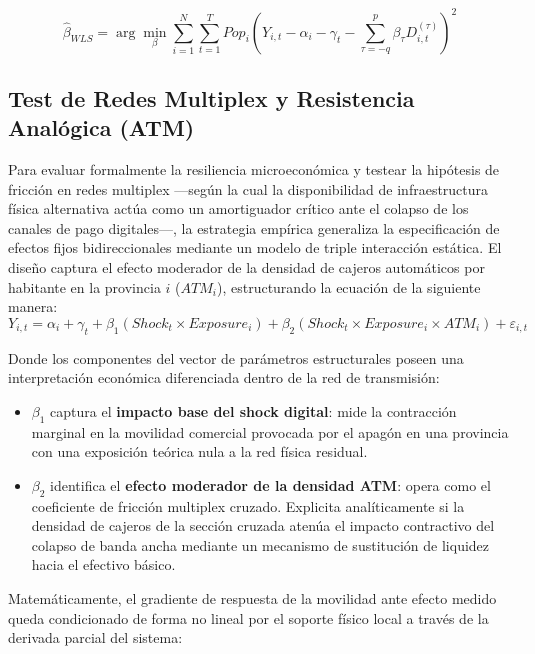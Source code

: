 \begin{equation}
    \hat{\beta}_{WLS} = \arg\min_{\beta} \sum_{i=1}^{N} \sum_{t=1}^{T} Pop_i \left( Y_{i,t} - \alpha_i - \gamma_t - \sum_{\tau = -q}^{p} \beta_{\tau} D_{i,t}^{(\tau)} \right)^2
\end{equation}

\subsection{Test de Redes Multiplex y Resistencia Anal\'ogica (ATM)}
\label{sec:4_2}

Para evaluar formalmente la resiliencia microecon\'omica y testear la hip\'otesis de fricci\'on en redes multiplex ---seg\'un la cual la disponibilidad de infraestructura f\'isica alternativa act\'ua como un amortiguador cr\'itico ante el colapso de los canales de pago digitales---, la estrategia emp\'irica generaliza la especificaci\'on de efectos fijos bidireccionales mediante un modelo de triple interacci\'on est\'atica. El dise\~no captura el efecto moderador de la densidad de cajeros autom\'aticos por habitante en la provincia $i$ ($ATM_i$), estructurando la ecuaci\'on de la siguiente manera:
\begin{equation}
    Y_{i,t} = \alpha_i + \gamma_t + \beta_1 \left( Shock_t \times Exposure_i \right) + \beta_2 \left( Shock_t \times Exposure_i \times ATM_i \right) + \varepsilon_{i,t}
    \label{eq:multiplex_atm}
\end{equation}

Donde los componentes del vector de par\'ametros estructurales poseen una interpretaci\'on econ\'omica diferenciada dentro de la red de transmisi\'on:

\begin{itemize}
    \item $\beta_1$ captura el \textbf{impacto base del shock digital}: mide la contracci\'on marginal en la movilidad comercial provocada por el apag\'on en una provincia con una exposici\'on te\'orica nula a la red f\'isica residual.
    \item $\beta_2$ identifica el \textbf{efecto moderador de la densidad ATM}: opera como el coeficiente de fricci\'on multiplex cruzado. Explicita anal\'iticamente si la densidad de cajeros de la secci\'on cruzada aten\'ua el impacto contractivo del colapso de banda ancha mediante un mecanismo de sustituci\'on de liquidez hacia el efectivo b\'asico.
\end{itemize}

Matem\'aticamente, el gradiente de respuesta de la movilidad ante efecto medido queda condicionado de forma no lineal por el soporte f\'isico local a trav\'es de la derivada parcial del sistema:

